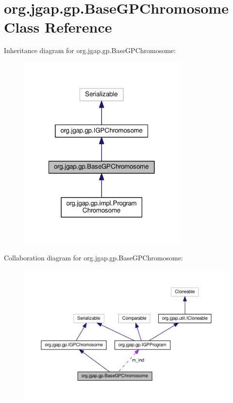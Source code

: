 \hypertarget{classorg_1_1jgap_1_1gp_1_1_base_g_p_chromosome}{\section{org.\-jgap.\-gp.\-Base\-G\-P\-Chromosome Class Reference}
\label{classorg_1_1jgap_1_1gp_1_1_base_g_p_chromosome}
}


Inheritance diagram for org.\-jgap.\-gp.\-Base\-G\-P\-Chromosome\-:
\nopagebreak
\begin{figure}[H]
\begin{center}
\leavevmode
\includegraphics[width=242pt]{classorg_1_1jgap_1_1gp_1_1_base_g_p_chromosome__inherit__graph}
\end{center}
\end{figure}


Collaboration diagram for org.\-jgap.\-gp.\-Base\-G\-P\-Chromosome\-:
\nopagebreak
\begin{figure}[H]
\begin{center}
\leavevmode
\includegraphics[width=350pt]{classorg_1_1jgap_1_1gp_1_1_base_g_p_chromosome__coll__graph}
\end{center}
\end{figure}
